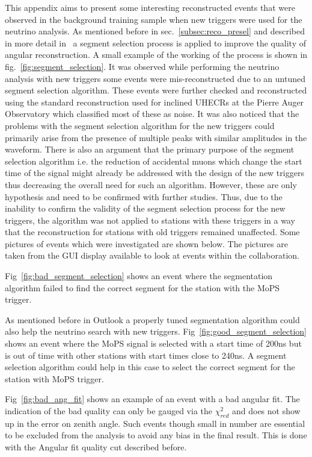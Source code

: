 This appendix aims to present some interesting reconstructed events that were observed in the background training sample when new triggers were used for the neutrino analysis. As mentioned before in sec.~\ref{subsec:reco_presel} and described in more detail in~\cite{gap_top_down_module} a segment selection process is applied to improve the quality of angular reconstruction. A small example of the working of the process is shown in fig.~\ref{fig:segment_selection}. It was observed while performing the neutrino analysis with new triggers some events were mis-reconstructed due to an untuned segment selection algorithm. These events were further checked and reconstructed using the standard reconstruction used for inclined UHECRs at the Pierre Auger Observatory which classified most of these as noise. It was also noticed that the problems with the segment selection algorithm for the new triggers could primarily arise from the presence of multiple peaks with similar amplitudes in the waveform. There is also an argument that the primary purpose of the segment selection algorithm i.e. the reduction of accidental muons which change the start time of the signal might already be addressed with the design of the new triggers thus decreasing the overall need for such an algorithm. However, these are only hypothesis and need to be confirmed with further studies. Thus, due to the inability to confirm the validity of the segment selection process for the new triggers, the algorithm was not applied to stations with these triggers in a way that the reconstruction for stations with old triggers remained unaffected. Some pictures of events which were investigated are shown below. The pictures are taken from the GUI display available to look at events within the collaboration.

Fig~\ref{fig:bad_segment_selection} shows an event where the segmentation algorithm failed to find the correct segment for the station with the MoPS trigger. 

As mentioned before in Outlook a properly tuned segmentation algorithm could also help the neutrino search with new triggers. Fig~\ref{fig:good_segment_selection} shows an event where the MoPS signal is selected with a start time of 200ns but is out of time with other stations with start times close to 240ns. A segment selection algorithm could help in this case to select the correct segment for the station with MoPS trigger.

Fig~\ref{fig:bad_ang_fit} shows an example of an event with a bad angular fit. The indication of the bad quality can only be gauged via the $\chi^2_{red}$ and does not show up in the error on zenith angle. Such events though small in number are essential to be excluded from the analysis to avoid any bias in the final result. This is done with the Angular fit quality cut described before. 

